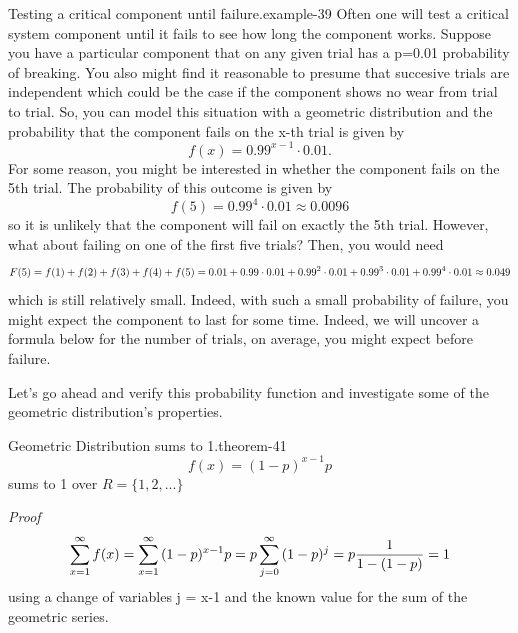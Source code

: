 \documentclass[10pt,]{book}
\makeatletter
\renewcommand*{\proofname}{Proof}
\renewenvironment{proof}[1][\proofname]{\par
  \pushQED{\qed}%
  \normalfont \topsep6\p@\@plus6\p@\relax
  \trivlist
  \item\relax
    {\itshape
    #1\@addpunct{.}}\hspace\labelsep\ignorespaces
}{%
  \popQED\endtrivlist\@endpefalse
}
\numberwithin{equation}{section}
\makeatother
\begin{document}
\begin{example}{Testing a critical component until failure.}{example-39}%
\hypertarget{p-935}{}%
Often one will test a critical system component until it fails to see how long the component works. Suppose you have a particular component that on any given trial has a p=0.01 probability of breaking. You also might find it reasonable to presume that succesive trials are independent which could be the case if the component shows no wear from trial to trial. So, you can model this situation with a geometric distribution and the probability that the component fails on the x-th trial is given by%
\begin{equation*}
f(x) = 0.99^{x-1} \cdot 0.01.
\end{equation*}
For some reason, you might be interested in whether the component fails on the 5th trial. The probability of this outcome is given by%
\begin{equation*}
f(5) = 0.99^4 \cdot 0.01 \approx 0.0096
\end{equation*}
so it is unlikely that the component will fail on exactly the 5th trial. However, what about failing on one of the first five trials? Then, you would need%
\begin{equation*}
F(5) = f(1)+f(2)+f(3)+f(4)+f(5) \\ = 0.01 + 0.99 \cdot 0.01 + 0.99^2 \cdot 0.01 + 0.99^3 \cdot 0.01 + 0.99^4 \cdot 0.01 \approx 0.049
\end{equation*}
which is still relatively small. Indeed, with such a small probability of failure, you might expect the component to last for some time. Indeed, we will uncover a formula below for the number of trials, on average, you might expect before failure.%
\end{example}
\hypertarget{p-936}{}%
Let's go ahead and verify this probability function and investigate some of the geometric distribution's properties.%
\par
\hypertarget{p-937}{}%
\begin{theorem}{Geometric Distribution sums to 1.}{}{theorem-41}%
\hypertarget{p-938}{}%
%
\begin{equation*}
f(x) = (1-p)^{x-1}p
\end{equation*}
sums to 1 over \(R = \{ 1, 2, ... \}\)%
\end{theorem}
\begin{proof}\hypertarget{proof-43}{}
\hypertarget{p-939}{}%
%
\begin{equation*}
\sum_{x=1}^{\infty} {f(x)} = \sum_{x=1}^{\infty} {(1-p)^{x-1} p} \\ = p \sum_{j=0}^{\infty} {(1-p)^j} = p \frac{1}{1-(1-p)} = 1
\end{equation*}
using a change of variables j = x-1 and the known value for the sum of the geometric series.%
\end{proof}
\end{document}

